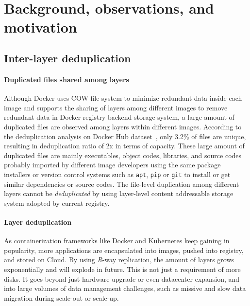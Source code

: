 \section{Background, observations, and motivation}
\label{sec:dataset-analysis}

%
%

%

%

\subsection{Inter-layer deduplication}

\paragraph{Duplicated files shared among layers}
Although Docker uses COW file system to minimize redundant data inside each image and
 supports the sharing of layers among different images to remove redundant data in Docker registry backend storage system,
 a large amount of duplicated files are observed among layers within different images.  
According to the deduplication analysis on Docker Hub dataset~\cite{dedupanalysis},
only 3.2\% of files are unique, resulting in deduplication ratio of 2x in terms of capacity. 
These large amount of duplicated files %
are mainly executables, object codes, libraries, and source codes probably
imported by different image developers using the same package installers or version control systems such as
\texttt{apt},  \texttt{pip} or \texttt{git} to install or get similar dependencies or source codes.
The file-level duplication among different layers cannot be \emph{deduplicated} 
by using layer-level content addressable storage system adopted by current registry.

\paragraph{Layer deduplication}
As containerization frameworks like Docker and Kubernetes keep gaining in popularity,
more applications are encapsulated into images, pushed into registry, and stored on Cloud.
By using \emph{R}-way replication, the amount of layers grows exponentially and will explode in future.
This is not just a requirement of more disks.
It goes beyond just hardware upgrade or even datacenter expansion,
and into large volumes of data management challenges, such as missive and slow data migration during scale-out or scale-up.
 
